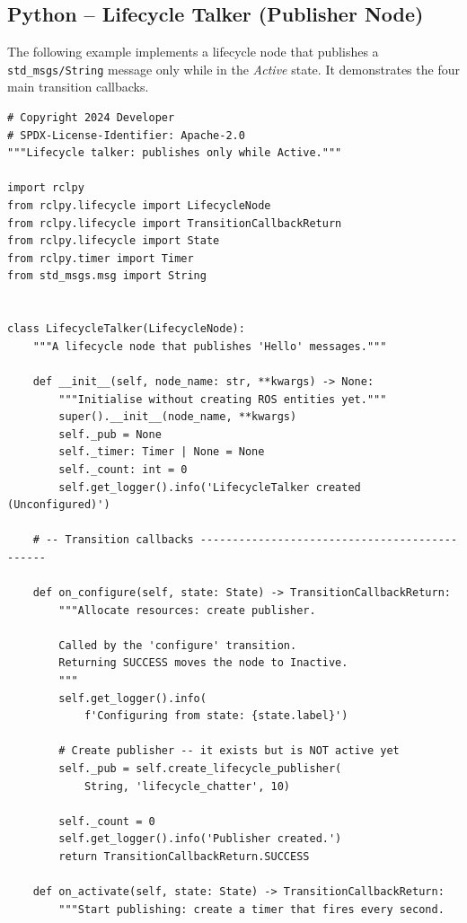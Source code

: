 \documentclass[12pt,a4paper]{article}
\newcommand{\code}[1]{\texttt{#1}}
\begin{document}
\subsection{Python -- Lifecycle Talker (Publisher Node)}
\label{sec:py-talker}

The following example implements a lifecycle node that publishes a
\code{std\_msgs/String} message only while in the \emph{Active} state.
It demonstrates the four main transition callbacks.

\begin{lstlisting}[style=python,caption={lifecycle\_talker.py -- full example}]
# Copyright 2024 Developer
# SPDX-License-Identifier: Apache-2.0
"""Lifecycle talker: publishes only while Active."""

import rclpy
from rclpy.lifecycle import LifecycleNode
from rclpy.lifecycle import TransitionCallbackReturn
from rclpy.lifecycle import State
from rclpy.timer import Timer
from std_msgs.msg import String


class LifecycleTalker(LifecycleNode):
    """A lifecycle node that publishes 'Hello' messages."""

    def __init__(self, node_name: str, **kwargs) -> None:
        """Initialise without creating ROS entities yet."""
        super().__init__(node_name, **kwargs)
        self._pub = None
        self._timer: Timer | None = None
        self._count: int = 0
        self.get_logger().info('LifecycleTalker created (Unconfigured)')

    # -- Transition callbacks ----------------------------------------------

    def on_configure(self, state: State) -> TransitionCallbackReturn:
        """Allocate resources: create publisher.

        Called by the 'configure' transition.
        Returning SUCCESS moves the node to Inactive.
        """
        self.get_logger().info(
            f'Configuring from state: {state.label}')

        # Create publisher -- it exists but is NOT active yet
        self._pub = self.create_lifecycle_publisher(
            String, 'lifecycle_chatter', 10)

        self._count = 0
        self.get_logger().info('Publisher created.')
        return TransitionCallbackReturn.SUCCESS

    def on_activate(self, state: State) -> TransitionCallbackReturn:
        """Start publishing: create a timer that fires every second.


\end{lstlisting}
\end{document}
